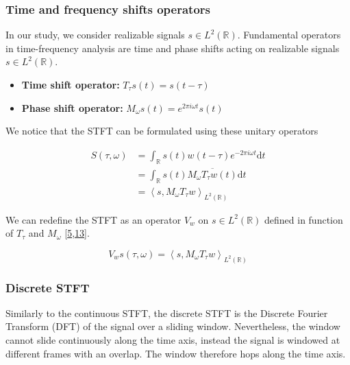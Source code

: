 \documentclass[american,]{article}
\providecommand{\tightlist}{%
  \setlength{\itemsep}{0pt}\setlength{\parskip}{0pt}}
\theoremstyle{definition}
\theoremstyle{definition}
\theoremstyle{definition}
\theoremstyle{remark}
\begin{document}
\hypertarget{time-and-frequency-shifts-operators}{%
\subsubsection{Time and frequency shifts operators}\label{time-and-frequency-shifts-operators}}

In our study, we consider realizable signals \(s\in L^2(\mathbb{R})\).
Fundamental operators in time-frequency analysis are
time and phase shifts acting on realizable signals \(s\in L^2(\mathbb{R})\).

\begin{itemize}
\tightlist
\item
  \textbf{Time shift operator:} \(T_\tau s(t)=s(t-\tau)\)
\item
  \textbf{Phase shift operator:} \(M_\omega s(t)=e^{2\pi i \omega t} s(t)\)
\end{itemize}

We notice that the STFT can be formulated using these unitary operators

\begin{align}
S(\tau,\omega) &= \int_\mathbb{R}s(t)w(t-\tau)e^{-2\pi i\omega t} \mathrm{d}t\\
    &= \int_\mathbb{R}s(t) \overline{M_\omega T_\tau w(t)} \mathrm{d}t\\
    &= \left\langle s, M_\omega T_\tau w\right\rangle_{L^2(\mathbb{R})}
\end{align}

We can redefine the STFT as an operator \(V_w\) on \(s\in L^2(\mathbb{R})\)
defined in function of \(T_\tau\) and \(M_\omega\) {[}\protect\hyperlink{ref-boscain2021}{5},\protect\hyperlink{ref-grochenig2001}{13}{]}.

\begin{equation}\label{eq:stft_operator}
V_w s(\tau,\omega) = \left\langle s, M_\omega T_\tau w\right\rangle_{L^2(\mathbb{R})}
\end{equation}

\hypertarget{discrete-stft}{%
\subsubsection{Discrete STFT}\label{discrete-stft}}

Similarly to the continuous STFT, the discrete STFT is the
Discrete Fourier Transform (DFT) of the signal over a sliding window.
Nevertheless, the window cannot slide continuously along the time axis,
instead the signal is windowed at different frames with an overlap.
The window therefore hops along the time axis.
\end{document}
